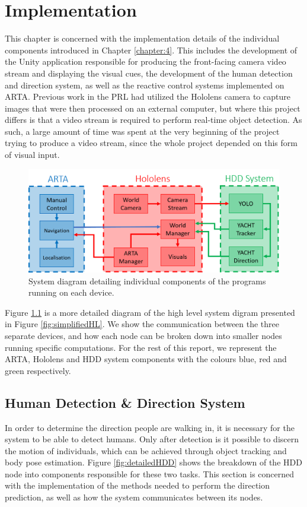 \chapter{Implementation}
This chapter is concerned with the implementation details of the individual components introduced in Chapter \ref{chapter:4}. This includes the development of the Unity application responsible for producing the front-facing camera video stream and displaying the visual cues, the development of the human detection and direction system, as well as the reactive control systems implemented on ARTA. Previous work in the PRL had utilized the Hololens camera to capture images that were then processed on an external computer, but where this project differs is that a video stream is required to perform real-time object detection. As such, a large amount of time was spent at the very beginning of the project trying to produce a video stream, since the whole project depended on this form of visual input.

\begin{figure}[ht]
	\centering
	\includegraphics[width=1.0\linewidth]{img/chapter5_implementation/detailedSystemDiagram.png}
	\caption{System diagram detailing individual components of the programs running on each device.}
	\label{fig:detailedHL}
\end{figure}

Figure \ref{fig:detailedHL} is a more detailed diagram of the high level system digram presented in Figure \ref{fig:simplifiedHL}. We show the communication between the three separate devices, and how each node can be broken down into smaller nodes running specific computations. For the rest of this report, we represent the ARTA, Hololens and HDD system components with the colours blue, red and green respectively.

\section{Human Detection \& Direction System}
In order to determine the direction people are walking in, it is necessary for the system to be able to detect humans. Only after detection is it possible to discern the motion of individuals, which can be achieved through object tracking and body pose estimation. Figure \ref{fig:detailedHDD} shows the breakdown of the HDD node into components responsible for these two tasks. This section is concerned with the implementation of the methods needed to perform the direction prediction, as well as how the system communicates between its nodes. 

